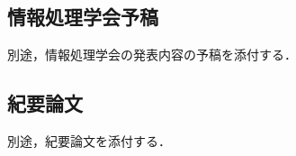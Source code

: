        \subsection{情報処理学会予稿}
        \label{情報処理学会予稿}
         \par 別途，情報処理学会の発表内容の予稿を添付する．

       \subsection{紀要論文}
        \label{紀要論文}
         \par 別途，紀要論文を添付する．

      
          
          
          
